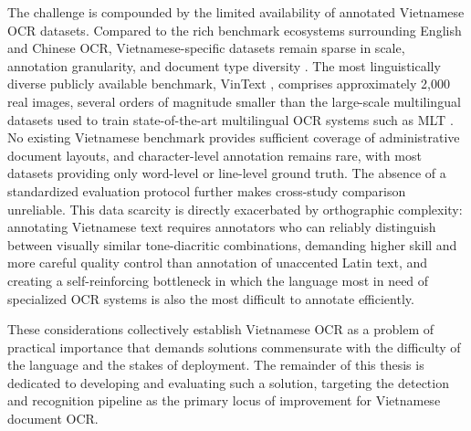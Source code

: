The challenge is compounded by the limited availability of annotated Vietnamese OCR datasets. Compared to the rich benchmark ecosystems surrounding English and Chinese OCR, Vietnamese-specific datasets remain sparse in scale, annotation granularity, and document type diversity \cite{Nguyen2021}. The most linguistically diverse publicly available benchmark, VinText \cite{Nguyen2021}, comprises approximately 2,000 real images, several orders of magnitude smaller than the large-scale multilingual datasets used to train state-of-the-art multilingual OCR systems such as MLT \cite{Nayef2017}. No existing Vietnamese benchmark provides sufficient coverage of administrative document layouts, and character-level annotation remains rare, with most datasets providing only word-level or line-level ground truth. The absence of a standardized evaluation protocol further makes cross-study comparison unreliable. This data scarcity is directly exacerbated by orthographic complexity: annotating Vietnamese text requires annotators who can reliably distinguish between visually similar tone-diacritic combinations, demanding higher skill and more careful quality control than annotation of unaccented Latin text, and creating a self-reinforcing bottleneck in which the language most in need of specialized OCR systems is also the most difficult to annotate efficiently.

These considerations collectively establish Vietnamese OCR as a problem of practical importance that demands solutions commensurate with the difficulty of the language and the stakes of deployment. The remainder of this thesis is dedicated to developing and evaluating such a solution, targeting the detection and recognition pipeline as the primary locus of improvement for Vietnamese document OCR.



